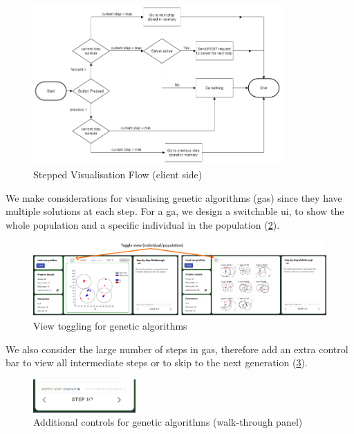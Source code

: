 \begin{figure}[H]
    \centering
    \includegraphics[width=0.85\textwidth]{images/stepped_solver_ui/walkthrough_flow.png}
    \caption{Stepped Visualisation Flow (client side)}
    \label{fig:step_sol_logic}
\end{figure}

We make considerations for visualising genetic algorithms (\acrshort{ga}s) since they have multiple solutions at each step. For a \acrshort{ga}, we design a switchable \acrshort{ui}, to show the whole population and a specific individual in the population (\cref{fig:step_sol_toggle}). 

\begin{figure}[H]
    \centering
    \includegraphics[width=\textwidth]{images/stepped_solver_ui/stepped_solver_toggle.png}
    \caption{View toggling for genetic algorithms}
    \label{fig:step_sol_toggle}
\end{figure}

We also consider the large number of steps in \acrshort{ga}s, therefore add an extra control bar to view all intermediate steps or to skip to the next generation (\cref{fig:step_sol_skip}).

\begin{figure}[H]
    \centering
    \includegraphics[width=0.35\textwidth]{images/stepped_solver_ui/stepped_solver_skip.png}
    \caption{Additional controls for genetic algorithms (walk-through panel)}
    \label{fig:step_sol_skip}
\end{figure}
